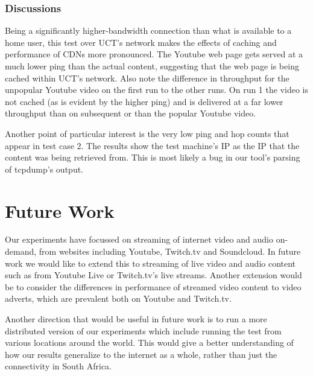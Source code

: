\documentclass{sig-alternate-05-2015}
\begin{document}
\subsubsection{Discussions}
Being a significantly higher-bandwidth connection than what is available to a home user, this test over UCT's network makes the effects of caching and performance of CDNs more pronounced. The Youtube web page  gets served at a much lower ping than the actual content, suggesting that the web page is being cached within UCT's network. Also note the difference in throughput for the unpopular Youtube video on the first run to the other runs. On run 1 the video is not cached (as is evident by the higher ping) and is delivered at a far lower throughput than on subsequent or than the popular Youtube video.

Another point of particular interest is the very low ping and hop counts that appear in test case 2. The results show the test machine's IP as the IP that the content was being retrieved from. This is most likely a bug in our tool's parsing of tcpdump's output.

\section{Future Work}\label{sec:futurework}
Our experiments have focussed on streaming of internet video and audio on-demand, from websites including Youtube, Twitch.tv and Soundcloud. In future work we would like to extend this to streaming of live video and audio content such as from Youtube Live or Twitch.tv's live streams. Another extension would be to consider the differences in performance of streamed video content to video adverts, which are prevalent both on Youtube and Twitch.tv.

Another direction that would be useful in future work is to run a more distributed version of our experiments which include running the test from various locations around the world. This would give a better understanding of how our results generalize to the internet as a whole, rather than just the connectivity in South Africa.

\small

\end{document}
